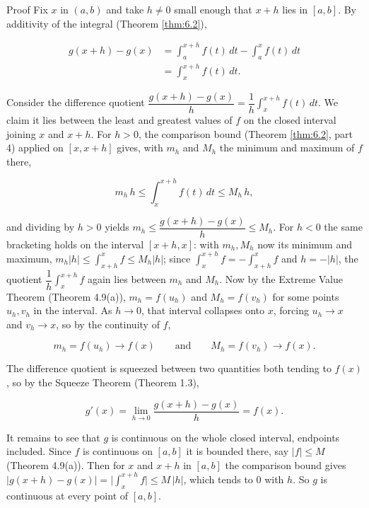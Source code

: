 \documentclass[a4paper,12pt,oneside]{memoir}
\begin{document}
\begin{envproof}{Proof}{}{}
Fix \(x\) in \((a, b)\) and take \(h \ne 0\) small enough that \(x + h\) lies in \([a, b]\). By additivity of the integral (Theorem \ref{thm:6.2}),

\[ \begin{aligned}
        g(x + h) - g(x) &= \int_{a}^{x+h} f(t)\,dt - \int_{a}^{x} f(t)\,dt \\[2pt]
                        &= \int_{x}^{x+h} f(t)\,dt.
      \end{aligned} \]

Consider the difference quotient \(\dfrac{g(x + h) - g(x)}{h} = \dfrac{1}{h}\displaystyle\int_{x}^{x+h} f(t)\,dt\). We claim it lies between the least and greatest values of \(f\) on the closed interval joining \(x\) and \(x + h\). For \(h > 0\), the comparison bound (Theorem \ref{thm:6.2}, part 4) applied on \([x, x+h]\) gives, with \(m_{h}\) and \(M_{h}\) the minimum and maximum of \(f\) there,

\[ m_{h}\,h \le \int_{x}^{x+h} f(t)\,dt \le M_{h}\,h, \]

and dividing by \(h > 0\) yields \(m_{h} \le \dfrac{g(x+h) - g(x)}{h} \le M_{h}\). For \(h < 0\) the same bracketing holds on the interval \([x + h, x]\): with \(m_{h}, M_{h}\) now its minimum and maximum, \(m_{h}\lvert h\rvert \le \int_{x+h}^{x} f \le M_{h}\lvert h\rvert\); since \(\int_{x}^{x+h} f = -\int_{x+h}^{x} f\) and \(h = -\lvert h\rvert\), the quotient \(\dfrac{1}{h}\int_{x}^{x+h} f\) again lies between \(m_{h}\) and \(M_{h}\). Now by the Extreme Value Theorem (Theorem 4.9(a)), \(m_{h} = f(u_{h})\) and \(M_{h} = f(v_{h})\) for some points \(u_{h}, v_{h}\) in the interval. As \(h \to 0\), that interval collapses onto \(x\), forcing \(u_{h} \to x\) and \(v_{h} \to x\), so by the continuity of \(f\),

\[ m_{h} = f(u_{h}) \to f(x) \qquad\text{and}\qquad M_{h} = f(v_{h}) \to f(x). \]

The difference quotient is squeezed between two quantities both tending to \(f(x)\), so by the Squeeze Theorem (Theorem 1.3),

\[ g'(x) = \lim_{h \to 0} \frac{g(x + h) - g(x)}{h} = f(x). \]

It remains to see that \(g\) is continuous on the whole closed interval, endpoints included. Since \(f\) is continuous on \([a, b]\) it is bounded there, say \(\lvert f\rvert \le M\) (Theorem 4.9(a)). Then for \(x\) and \(x + h\) in \([a, b]\) the comparison bound gives \(\bigl\lvert g(x+h) - g(x)\bigr\rvert = \bigl\lvert\int_{x}^{x+h} f\bigr\rvert \le M\,\lvert h\rvert\), which tends to \(0\) with \(h\). So \(g\) is continuous at every point of \([a, b]\). \qedmark
\end{envproof}
\end{document}
